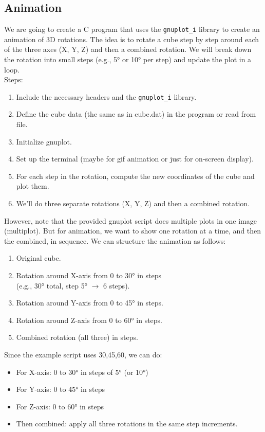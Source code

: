 \documentclass[a4paper,10pt]{article}
\begin{document}
\subsection{Animation}
We are going to create a C program that uses the \verb|gnuplot_i| library to create an animation of 3D rotations.
The idea is to rotate a cube step by step around each of the three axes (X, Y, Z) and then a combined rotation.
We will break down the rotation into small steps (e.g., 5° or 10° per step) and update the plot in a loop.\\
Steps:
\begin{enumerate}
\item Include the necessary headers and the \verb|gnuplot_i| library.
\item Define the cube data (the same as in cube.dat) in the program or read from file.
\item Initialize gnuplot.
\item Set up the terminal (maybe for gif animation or just for on-screen display).
\item For each step in the rotation, compute the new coordinates of the cube and plot them.
\item We'll do three separate rotations (X, Y, Z) and then a combined rotation.
\end{enumerate}
However, note that the provided gnuplot script does multiple plots in one image (multiplot).
But for animation, we want to show one rotation at a time, and then the combined, in sequence.
We can structure the animation as follows:
\begin{enumerate}
\item Original cube.
\item Rotation around X-axis from 0 to 30° in steps\\(e.g., 30° total, step 5° \(\rightarrow\) 6 steps).
\item Rotation around Y-axis from 0 to 45° in steps.
\item Rotation around Z-axis from 0 to 60° in steps.
\item Combined rotation (all three) in steps.
\end{enumerate}
Since the example script uses 30,45,60, we can do:
\begin{itemize}
\item For X-axis: 0 to 30° in steps of 5° (or 10°)
\item For Y-axis: 0 to 45° in steps
\item For Z-axis: 0 to 60° in steps
\item Then combined: apply all three rotations in the same step increments.
\end{itemize}
\end{document}
